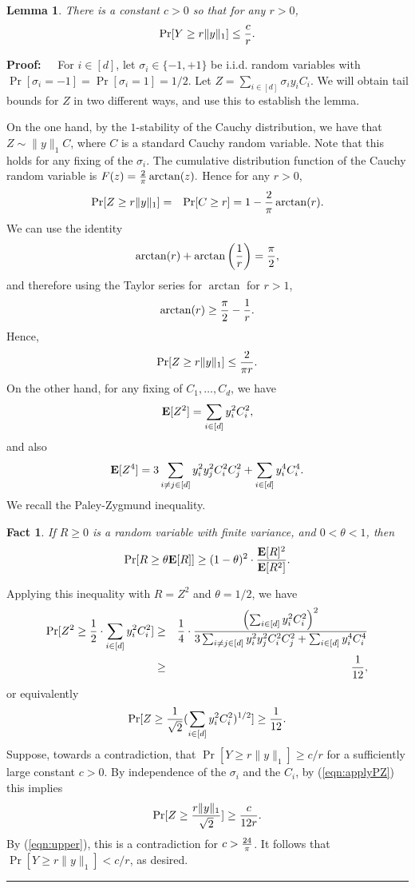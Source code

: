 \documentclass[11pt]{article}
\newtheorem{lemma}[theorem]{Lemma}
\newenvironment{proof}{\begin{trivlist} \item {\bf Proof:~~}}
  {\qed\end{trivlist}}
\def\frac#1#2{{#1\over #2}}
\def\qed{\hfill\rule{2mm}{2mm}}
\newtheorem{fact}{Fact}
\begin{document}
\begin{lemma}\label{lem:cauchy-l2}
There is a constant $c > 0$ so that for any $r > 0$,
$$\Pr[Y \geq r \|y\|_1] \leq \frac{c}{r}.$$
\end{lemma}
\begin{proof}
For $i \in [d]$, let $\sigma_i \in \{-1,+1\}$ be i.i.d. random variables with $\Pr[\sigma_i = -1] = \Pr[\sigma_i = 1] = 1/2$. 
Let $Z = \sum_{i \in [d]} \sigma_i y_i C_i$. We will obtain tail bounds for $Z$ in two different ways, and use this to establish
the lemma.

On the one hand, by the $1$-stability of the Cauchy distribution, we have that $Z \sim \|y\|_1 C$, where $C$ is a standard
Cauchy random variable. Note that this holds for any fixing of the $\sigma_i$. The cumulative distribution function
of the Cauchy random variable is $F(z) = \frac{2}{\pi} \arctan(z).$ Hence for any $r > 0$,
\begin{eqnarray*}
\Pr[Z \geq r \|y\|_1] & = & \Pr[C \geq r] = 1 - \frac{2}{\pi} \arctan(r).
\end{eqnarray*}
We can use the identity 
$$\arctan(r) + \arctan \left (\frac{1}{r} \right) = \frac{\pi}{2},$$
and therefore using the Taylor series for $\arctan$ for $r > 1$,
$$\arctan(r) \geq \frac{\pi}{2} - \frac{1}{r}.$$
Hence,
\begin{eqnarray}\label{eqn:upper}
\Pr[Z \geq r \|y\|_1] \leq \frac{2}{\pi r}.
\end{eqnarray}
On the other hand, for any fixing of $C_1, \ldots, C_d$, we have
$${\bf E}[Z^2] = \sum_{i \in [d]} y_i^2 C_i^2,$$
and also 
$${\bf E}[Z^4] = 3 \sum_{i \neq j \in [d]} y_i^2 y_j^2 C_i^2 C_j^2 + \sum_{i \in [d]} y_i^4 C_i^4.$$
We recall the Paley-Zygmund inequality.
\begin{fact}
If $R \geq 0$ is a random variable with finite variance, and $0 < \theta < 1$, then
$$\Pr[R \geq \theta {\bf E}[R]] \geq (1-\theta)^2 \cdot \frac{{\bf E}[R]^2}{{\bf E}[R^2]}.$$
\end{fact}
Applying this inequality with $R = Z^2$ and $\theta = 1/2$, we have
\begin{eqnarray*}
\Pr[Z^2 \geq \frac{1}{2} \cdot \sum_{i \in [d]} y_i^2 C_i^2] & \geq & 
\frac{1}{4} \cdot \frac{\left (\sum_{i \in [d]} y_i^2 C_i^2 \right )^2}{3 \sum_{i \neq j \in [d]} y_i^2 y_j^2 C_i^2 C_j^2 + \sum_{i \in [d]} y_i^4 C_i^4}\\
& \geq & \frac{1}{12},
\end{eqnarray*}
or equivalently 
\begin{eqnarray}\label{eqn:applyPZ}
\Pr[Z \geq \frac{1}{\sqrt{2}} (\sum_{i \in [d]} y_i^2 C_i^2)^{1/2}] \geq \frac{1}{12}.
\end{eqnarray}
Suppose, towards a contradiction, that $\Pr[Y \geq r \|y\|_1] \geq c/r$ for a sufficiently large constant $c > 0$. By independence of the $\sigma_i$ and the $C_i$, by
(\ref{eqn:applyPZ}) this implies
$$\Pr[Z \geq \frac{r \|y\|_1}{\sqrt{2}}] \geq \frac{c}{12r}.$$
By (\ref{eqn:upper}), this is a contradiction for $c > \frac{24}{\pi}$. It follows that $\Pr[Y \geq r \|y\|_1] < c/r$, as desired. 
\end{proof} 
\end{document}
